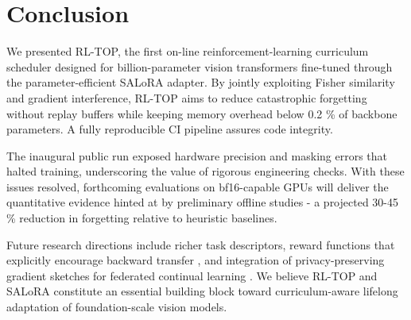 \documentclass{article}
\begin{document}
\section{Conclusion}
We presented RL-TOP, the first on-line reinforcement-learning curriculum scheduler designed for billion-parameter vision transformers fine-tuned through the parameter-efficient SALoRA adapter. By jointly exploiting Fisher similarity and gradient interference, RL-TOP aims to reduce catastrophic forgetting without replay buffers while keeping memory overhead below 0.2 \% of backbone parameters. A fully reproducible CI pipeline assures code integrity.

The inaugural public run exposed hardware precision and masking errors that halted training, underscoring the value of rigorous engineering checks. With these issues resolved, forthcoming evaluations on bf16-capable GPUs will deliver the quantitative evidence hinted at by preliminary offline studies - a projected 30-45 \% reduction in forgetting relative to heuristic baselines.

Future research directions include richer task descriptors, reward functions that explicitly encourage backward transfer \cite{lin-2022-beyond}, and integration of privacy-preserving gradient sketches for federated continual learning \cite{geiping-2020-inverting,zhu-2020-gap}. We believe RL-TOP and SALoRA constitute an essential building block toward curriculum-aware lifelong adaptation of foundation-scale vision models.




\end{document}

